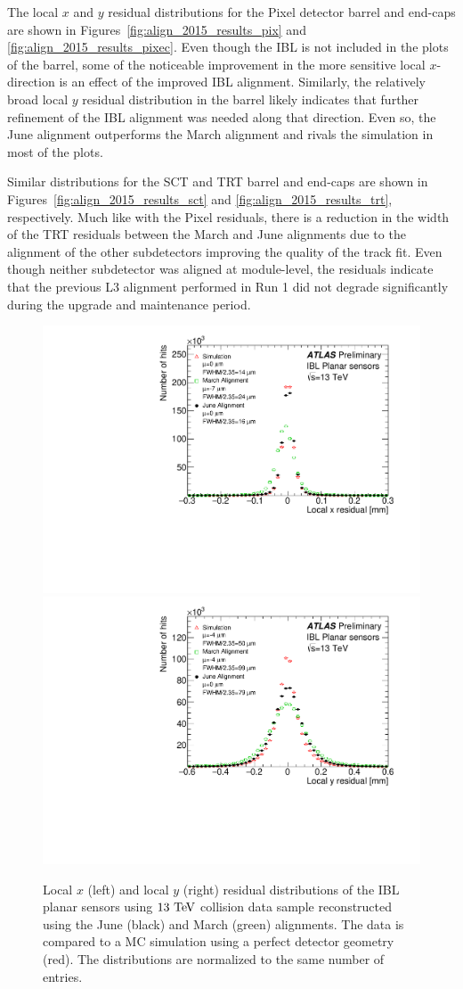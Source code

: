 The local $x$ and $y$ residual distributions for the Pixel detector barrel and end-caps are shown in Figures~\ref{fig:align_2015_results_pix} and \ref{fig:align_2015_results_pixec}.
Even though the IBL is not included in the plots of the barrel, some of the noticeable improvement in the more sensitive local $x$-direction is an effect of the improved IBL alignment.
Similarly, the relatively broad local $y$ residual distribution in the barrel likely indicates that further refinement of the IBL alignment was needed along that direction.
Even so, the June alignment outperforms the March alignment and rivals the simulation in most of the plots.

Similar distributions for the SCT and TRT barrel and end-caps are shown in Figures~\ref{fig:align_2015_results_sct} and \ref{fig:align_2015_results_trt}, respectively.
Much like with the Pixel residuals, there is a reduction in the width of the TRT residuals between the March and June alignments due to the alignment of the other subdetectors improving the quality of the track fit.
Even though neither subdetector was aligned at module-level, the residuals indicate that the previous L3 alignment performed in Run 1 did not degrade significantly during the upgrade and maintenance period.

\begin{figure}[htbp]
  \centering
  \includegraphics[width=.48\textwidth]{figs/alignment/align2015/PIXIBL_Planar_xRES}
  \includegraphics[width=.48\textwidth]{figs/alignment/align2015/PIXIBL_Planar_yRES}
  \caption{Local $x$ (left) and local $y$ (right) residual distributions of the IBL planar sensors using $13\tev$ collision data sample reconstructed using the June (black) and March (green) alignments.  The data is compared to a MC simulation using a perfect detector geometry (red).  The distributions are normalized to the same number of entries.}
  \label{fig:align_2015_results_ibl}
\end{figure}

